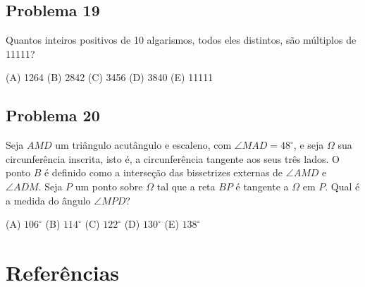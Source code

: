 \documentclass[12pt]{article}
\begin{document}
\subsection{Problema 19}
\begin{tcolorbox}[statementbox]
Quantos inteiros positivos de 10 algarismos, todos eles distintos, são múltiplos de 11111?

(A) 1264 (B) 2842 (C) 3456 (D) 3840 (E) 11111
\end{tcolorbox}
\clearpage

\subsection{Problema 20}
\begin{tcolorbox}[statementbox]
Seja $AMD$ um triângulo acutângulo e escaleno, com $\angle MAD = 48^\circ$, e seja $\Omega$ sua circunferência inscrita, isto é, a circunferência tangente aos seus três lados. O ponto $B$ é definido como a interseção das bissetrizes externas de $\angle AMD$ e $\angle ADM$. Seja $P$ um ponto sobre $\Omega$ tal que a reta $BP$ é tangente a $\Omega$ em $P$. Qual é a medida do ângulo $\angle MPD$?

(A) $106^\circ$ (B) $114^\circ$ (C) $122^\circ$ (D) $130^\circ$ (E) $138^\circ$
\end{tcolorbox}
\clearpage

\clearpage


  \section{\textsf{Referências}}
\end{document}
